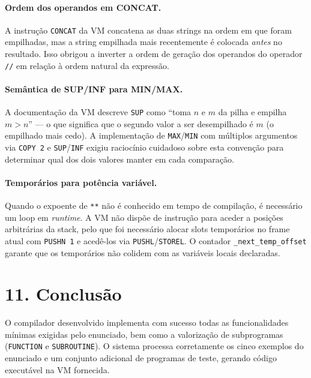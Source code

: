 \documentclass[a4paper]{article}
\begin{document}
\paragraph{Ordem dos operandos em CONCAT.} A instrução \texttt{CONCAT} da VM concatena as duas strings na ordem em que foram empilhadas, mas a string empilhada mais recentemente é colocada \textit{antes} no resultado. Isso obrigou a inverter a ordem de geração dos operandos do operador \texttt{//} em relação à ordem natural da expressão.

\paragraph{Semântica de SUP/INF para MIN/MAX.} A documentação da VM descreve \texttt{SUP} como ``toma $n$ e $m$ da pilha e empilha $m > n$'' — o que significa que o segundo valor a ser desempilhado é $m$ (o empilhado mais cedo). A implementação de \texttt{MAX}/\texttt{MIN} com múltiplos argumentos via \texttt{COPY 2} e \texttt{SUP}/\texttt{INF} exigiu raciocínio cuidadoso sobre esta convenção para determinar qual dos dois valores manter em cada comparação.

\paragraph{Temporários para potência variável.} Quando o expoente de \texttt{**} não é conhecido em tempo de compilação, é necessário um loop em \textit{runtime}. A VM não dispõe de instrução para aceder a posições arbitrárias da stack, pelo que foi necessário alocar slots temporários no frame atual com \texttt{PUSHN 1} e acedê-los via \texttt{PUSHL}/\texttt{STOREL}. O contador \texttt{\_next\_temp\_offset} garante que os temporários não colidem com as variáveis locais declaradas.

\section*{11. Conclusão}

\noindent O compilador desenvolvido implementa com sucesso todas as funcionalidades mínimas exigidas pelo enunciado, bem como a valorização de subprogramas (\texttt{FUNCTION} e \texttt{SUBROUTINE}). O sistema processa corretamente os cinco exemplos do enunciado e um conjunto adicional de programas de teste, gerando código executável na VM fornecida.
\end{document}

